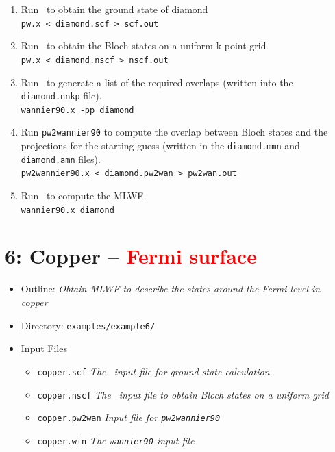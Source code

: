 \documentclass[a4paper,11pt,twoside]{article}
\def\tent#1{\textcolor{red}{#1}}     %
\begin{document}
\begin{enumerate}
\item Run \pwscf\ to obtain the ground state of diamond\\
{\tt pw.x < diamond.scf > scf.out}

\item Run \pwscf\ to obtain the Bloch states on a uniform k-point grid\\
{\tt pw.x < diamond.nscf > nscf.out}

\item Run \wannier\ to generate a list of the required overlaps (written
  into the {\tt diamond.nnkp} file).\\ 
{\tt wannier90.x -pp diamond}

\item Run {\tt pw2wannier90} to compute the overlap between Bloch
  states and the projections for the starting guess (written in the
  {\tt diamond.mmn} and {\tt diamond.amn} files).\\  
{\tt pw2wannier90.x < diamond.pw2wan > pw2wan.out}

\item Run \wannier\ to compute the MLWF.\\
{\tt wannier90.x diamond}
\end{enumerate}

\cleardoublepage

\section*{6: Copper \tent{-- Fermi surface}}

\begin{itemize}
\item{Outline: \it{Obtain MLWF to describe the states around the
    Fermi-level in copper}}
\item{Directory: {\tt examples/example6/}}
\item{Input Files}
\begin{itemize}
\item{ {\tt copper.scf}  {\it The \pwscf\ input file for ground state
    calculation}} 
\item{ {\tt copper.nscf}  {\it The \pwscf\ input file to obtain Bloch states
    on a uniform grid}} 
\item{ {\tt copper.pw2wan}  {\it Input file for {\tt pw2wannier90}}}
\item{ {\tt copper.win}  {\it The {\tt wannier90} input file}}
\end{itemize}

\end{itemize}
\end{document}
